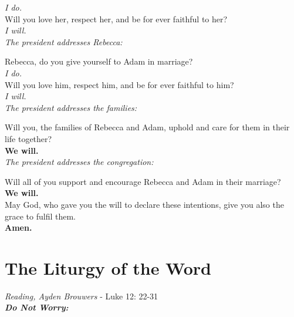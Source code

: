 \documentclass[a4paper,12pt,titlepage]{article}
\begin{document}
{\em \hspace{2em} I do.} \\

Will you love her, respect her, and be for ever faithful to her? \\

{\em \hspace{2em} I will.}\\

{\em The president addresses Rebecca:} 

Rebecca, do you give yourself to Adam in marriage?\\

{\em \hspace{2em} I do.}\\

Will you love him, respect him, and be for ever faithful to him?\\ 

{\em \hspace{2em} I will.}\\

{\em The president addresses the families:}

Will you, the families of Rebecca and Adam, 
uphold and care for them in their life together?\\

{\bf \hspace{2em} We will.}\\

{\em The president addresses the congregation:}

Will all of you support and encourage Rebecca and Adam in their marriage?\\

{\bf \hspace{2em} We will.}\\

May God, who gave you the will to declare these intentions, give you also the 
grace to fulfil them.\\

{\bf Amen.}

\clearpage
\section{The Liturgy of the Word}

{\em Reading, Ayden Brouwers } - Luke 12: 22-31\\ 

{\bf \em Do Not Worry:}
\end{document}
